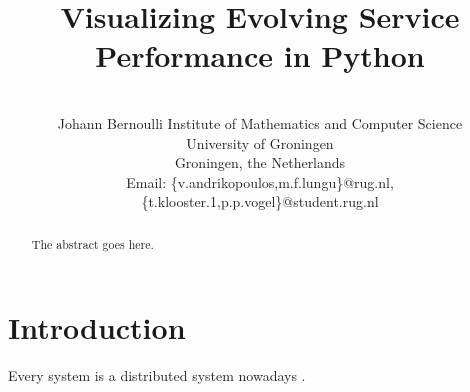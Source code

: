 \documentclass[conference]{IEEEtran}
\begin{document}
%
\title{Visualizing Evolving Service Performance in Python }



\author{
\\
Johann Bernoulli Institute of Mathematics and Computer Science\\
University of Groningen\\
Groningen, the Netherlands\\
Email: \{v.andrikopoulos,m.f.lungu\}@rug.nl, \{t.klooster.1,p.p.vogel\}@student.rug.nl
}

\maketitle

\begin{abstract}
The abstract goes here.
\end{abstract}


\IEEEpeerreviewmaketitle



\section{Introduction}
Every system is a distributed system nowadays \cite{cavage2013there}. 
 
\end{document}
